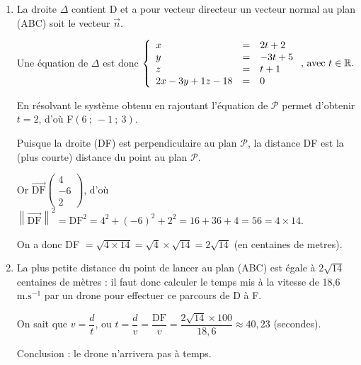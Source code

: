 \documentclass[10pt]{article}
\providecommand{\R}{\mathbb{R}}
\providecommand{\vect}[1]{\overrightarrow{#1}}
\begin{document}
\begin{enumerate}[resume]
\begin{enumerate}
$7t - 28 = 0 \iff 7t = 28 \iff t = 4$.

D'où les coordonnées de E en remplaçant $t$ par dans les équations de $d$ : E(14~;~9~;~17)
	\end{enumerate}
	\item 
La droite $\Delta$ contient D et a pour vecteur directeur un vecteur normal au plan (ABC) soit le vecteur $\vect{n}$.

Une équation de $\Delta$ est donc $\left\{\begin{array}{l c l}
x&=&2t+2\\y&=&-3t+5\\z&=&t+1\\
2x - 3y + 1z - 18 &=& 0
\end{array}\right.\text{, avec } t \in \R.$

En résolvant le système obtenu en rajoutant l'équation de $\mathcal{P}$ permet d'obtenir $t = 2$, d'où F$(6~;~-1~;~3)$.

Puisque la droite (DF) est perpendiculaire au plan $\mathcal{P}$, la distance DF est la (plus courte) distance du point au plan $\mathcal{P}$.

Or $\vect{\text{DF}}\begin{pmatrix}4\\-6\\2\end{pmatrix}$, d'où $\left\|\vect{\text{DF}}\right\|^2 = \text{DF}^2 = 4^2 + (-6)^2 + 2^2 = 16 + 36 + 4 = 56 = 4 \times 14$.

On a donc DF $ = \sqrt{4 \times 14} = \sqrt 4 \times \sqrt{14} = 2\sqrt{14}$ (en centaines de metres).
	

	\item 
	

La plus petite distance du point de lancer au plan (ABC) est égale à $2\sqrt{14}$ centaines de mètres : il faut donc calculer le temps mis à la vitesse de 18,6~$\text{m.s}^{-1}$ par un drone pour effectuer ce parcours de D à F.

On sait que $v = \dfrac{d}{t}$, ou $t = \dfrac{d}{v} = \dfrac{\text{DF}}{v} = \dfrac{2\sqrt{14} \times 100}{18,6} \approx 40,23$ (secondes).

Conclusion : le drone n'arrivera pas à temps.
\end{enumerate}
\end{document}
